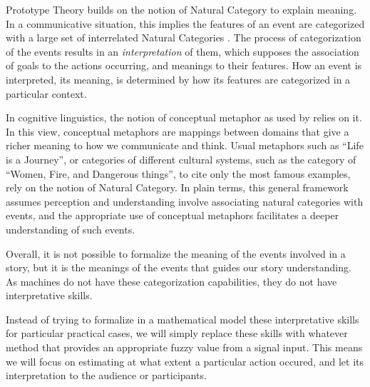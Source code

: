 \documentclass[
		twoside,openright,titlepage,numbers=noenddot,manychapters,
		headinclude,%
                footinclude=false,cleardoublepage=empty,
                BCOR=5mm,
		fontsize=11pt, %
                 enabledeprecatedfontcommands]{scrreprt}
\begin{document}
 Prototype Theory builds on the notion of Natural Category to explain meaning.  In a communicative situation, this implies the features of an event are categorized with a large set of interrelated Natural Categories \cite[]{rosch1978principles}.  The process of categorization of the events results in an \emph{interpretation} of them, which supposes the association of goals to the actions occurring, and meanings to their features. How an event is interpreted, its meaning, is determined by how its features are categorized in a particular context. 

In cognitive linguistics, the notion of conceptual metaphor as used by \cite{lakoff1980mwl} relies on it. In this view, conceptual metaphors are mappings between domains that give a richer meaning to how we communicate and think. Usual metaphors such as ``Life is a Journey'', or categories of different cultural systems, such as  the category of ``Women, Fire, and Dangerous things'', to cite only the most famous examples, rely on the notion of Natural Category. 
In plain terms, this general framework assumes perception and understanding involve associating natural categories with events, and the appropriate use of conceptual metaphors  facilitates a deeper understanding of such events. 


 Overall, it is not possible to formalize the meaning of the events involved in a story, but it is the meanings of the events that guides our story understanding.  As machines do not have these categorization capabilities, they do not have interpretative skills.

Instead of trying to formalize in a mathematical model these interpretative skills for particular practical cases, we will simply replace these skills with whatever method that provides an appropriate fuzzy value from a signal input.  This means we will focus on estimating at what extent a particular action occured, and let its interpretation to the audience or participants.

\end{document}
